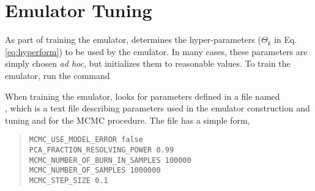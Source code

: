 \section{Emulator Tuning}

As part of training the emulator,  determines the hyper-parameters ($\Theta_k$ in Eq. \eqref{eq:hyperform}) to be used by the emulator. In many cases, these parameters are simply chosen \emph{ad hoc}, but  initializes them to reasonable values. To train the emulator, run the command


When training the emulator,  looks for parameters defined in a file named\\ , which is a text file describing parameters used in the emulator construction and tuning and for the MCMC procedure. The file has a simple form, 

\begin{quote}
{\tt MCMC\_USE\_MODEL\_ERROR             false}\\
{\tt PCA\_FRACTION\_RESOLVING\_POWER     0.99}\\
{\tt MCMC\_NUMBER\_OF\_BURN\_IN\_SAMPLES 100000}\\
{\tt MCMC\_NUMBER\_OF\_SAMPLES           1000000}\\
{\tt MCMC\_STEP\_SIZE                    0.1}
\end{quote}

